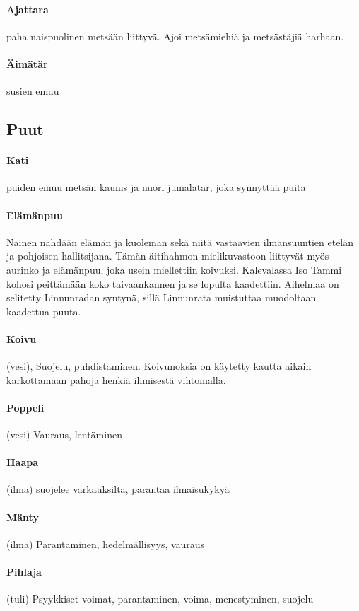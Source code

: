   \paragraph{Ajattara} paha naispuolinen metsään liittyvä. Ajoi metsämiehiä ja metsästäjiä 
    harhaan. 
  \paragraph{Äimätär} susien emuu 

  

\subsection{Puut}

  \paragraph{Kati}  puiden emuu metsän kaunis ja nuori jumalatar, joka synnyttää puita 
  \paragraph{Elämänpuu} Nainen nähdään elämän ja kuoleman sekä niitä vastaavien ilmansuuntien 
    etelän ja pohjoisen hallitsijana. Tämän äitihahmon mielikuvastoon liittyvät myös aurinko ja 
    elämänpuu, joka usein miellettiin koivuksi. Kalevalassa Iso Tammi kohosi peittämään koko 
    taivaankannen ja se lopulta kaadettiin. Aihelmaa on selitetty Linnunradan syntynä, sillä 
    Linnunrata muistuttaa muodoltaan kaadettua puuta.
  \paragraph{Koivu} (vesi), Suojelu, puhdistaminen. Koivunoksia on käytetty kautta aikain 
    karkottamaan pahoja henkiä ihmisestä vihtomalla. 
  \paragraph{Poppeli} (vesi) Vauraus, lentäminen
  \paragraph{Haapa} (ilma) suojelee varkauksilta, parantaa ilmaisukykyä
  \paragraph{Mänty} (ilma) Parantaminen, hedelmällisyys, vauraus
  \paragraph{Pihlaja} (tuli) Psyykkiset voimat, parantaminen, voima, menestyminen, suojelu
